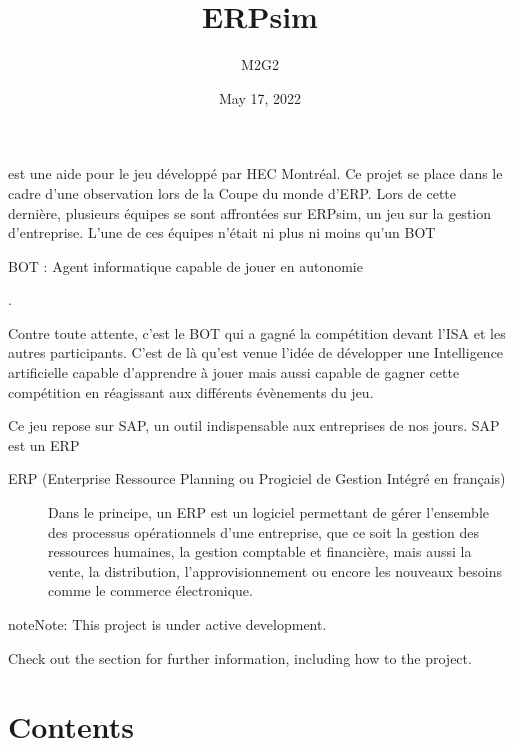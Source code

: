 \documentclass[letterpaper,10pt,english]{sphinxmanual}
\title{ERPsim}
\date{May 17, 2022}
\author{M2\sphinxhyphen{}G2}
\begin{document}
\pagestyle{empty}
\sphinxmaketitle
\pagestyle{plain}
\sphinxtableofcontents
\pagestyle{normal}
\label{\detokenize{index::doc}}


\sphinxAtStartPar
{} est une aide pour le jeu  développé par HEC Montréal.
Ce projet se place dans le cadre d’une observation lors de la Coupe du monde d’ERP. Lors de cette dernière,
plusieurs équipes se sont affrontées sur ERPsim, un jeu sur la gestion d’entreprise. L’une de ces équipes n’était ni plus ni moins qu’un BOT %
\begin{footnote}[1]\sphinxAtStartFootnote
BOT : Agent informatique capable de jouer en autonomie
%
\end{footnote}.

\sphinxAtStartPar
Contre toute attente, c’est le BOT qui a gagné la compétition devant l’ISA et les autres participants. C’est de là qu’est venue l’idée de développer
une Intelligence artificielle capable d’apprendre à jouer mais aussi capable de gagner cette compétition en réagissant aux différents évènements du jeu.

\sphinxAtStartPar
Ce jeu repose sur SAP, un outil indispensable aux entreprises de nos jours. SAP est un ERP
\begin{description}
\item[{ERP (Enterprise Ressource Planning ou Progiciel de Gestion Intégré en français)}] \leavevmode
\sphinxAtStartPar
Dans le principe, un ERP est un logiciel permettant de gérer l’ensemble des processus opérationnels d’une entreprise, que ce soit la gestion des ressources humaines,
la gestion comptable et financière, mais aussi la vente, la distribution, l’approvisionnement ou encore les nouveaux besoins comme le commerce électronique.

\end{description}

\begin{sphinxadmonition}{note}{Note:}
\sphinxAtStartPar
This project is under active development.
\end{sphinxadmonition}

\sphinxAtStartPar
Check out the {\hyperref[\detokenize{Usage::doc}]{}} section for further information, including how to
{\hyperref[\detokenize{Installation:id1}]{}} the project.


\chapter{Contents}
\label{\detokenize{index:contents}}
\sphinxstepscope
\end{document}
